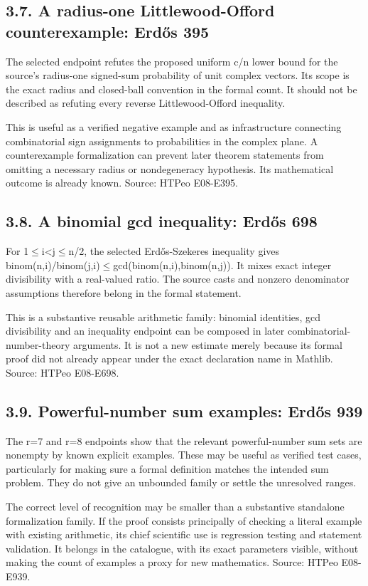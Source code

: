 \documentclass[11pt,a4paper]{article}
\begin{document}
\subsection{3.7. A radius-one Littlewood-Offord counterexample: Erdős 395}
The selected endpoint refutes the proposed uniform c/n lower bound for the source's radius-one signed-sum probability of unit complex vectors. Its scope is the exact radius and closed-ball convention in the formal count. It should not be described as refuting every reverse Littlewood-Offord inequality.

This is useful as a verified negative example and as infrastructure connecting combinatorial sign assignments to probabilities in the complex plane. A counterexample formalization can prevent later theorem statements from omitting a necessary radius or nondegeneracy hypothesis. Its mathematical outcome is already known. Source: HTPeo E08-E395.

\subsection{3.8. A binomial gcd inequality: Erdős 698}
For 1\ensuremath{\leq}i<j\ensuremath{\leq}n/2, the selected Erdős-Szekeres inequality gives binom(n,i)/binom(j,i)\ensuremath{\leq}gcd(binom(n,i),binom(n,j)). It mixes exact integer divisibility with a real-valued ratio. The source casts and nonzero denominator assumptions therefore belong in the formal statement.

This is a substantive reusable arithmetic family: binomial identities, gcd divisibility and an inequality endpoint can be composed in later combinatorial-number-theory arguments. It is not a new estimate merely because its formal proof did not already appear under the exact declaration name in Mathlib. Source: HTPeo E08-E698.

\subsection{3.9. Powerful-number sum examples: Erdős 939}
The r=7 and r=8 endpoints show that the relevant powerful-number sum sets are nonempty by known explicit examples. These may be useful as verified test cases, particularly for making sure a formal definition matches the intended sum problem. They do not give an unbounded family or settle the unresolved ranges.

The correct level of recognition may be smaller than a substantive standalone formalization family. If the proof consists principally of checking a literal example with existing arithmetic, its chief scientific use is regression testing and statement validation. It belongs in the catalogue, with its exact parameters visible, without making the count of examples a proxy for new mathematics. Source: HTPeo E08-E939.
\end{document}
